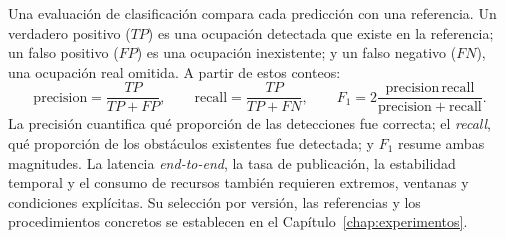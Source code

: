 Una evaluación de clasificación compara cada predicción con una referencia. Un verdadero
positivo ($TP$) es una ocupación detectada que existe en la referencia; un falso positivo ($FP$)
es una ocupación inexistente; y un falso negativo ($FN$), una ocupación real omitida. A partir de
estos conteos:
\begin{equation}
  \mathrm{precision}=\frac{TP}{TP+FP},\qquad
  \mathrm{recall}=\frac{TP}{TP+FN},\qquad
  F_1=2\frac{\mathrm{precision}\,\mathrm{recall}}
  {\mathrm{precision}+\mathrm{recall}}.
  \label{eq:classification-metrics}
\end{equation}
La precisión cuantifica qué proporción de las detecciones fue correcta; el \emph{recall}, qué
proporción de los obstáculos existentes fue detectada; y $F_1$ resume ambas magnitudes. La
latencia \emph{end-to-end}, la tasa de publicación, la estabilidad temporal y el consumo de
recursos también requieren extremos, ventanas y condiciones explícitas. Su selección por versión,
las referencias y los procedimientos concretos se establecen en el
Capítulo~\ref{chap:experimentos}.
